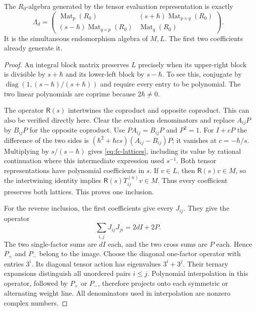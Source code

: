 \begin{theorem}\label{thm:fc-image}
The \(R_0\)-algebra generated by the tensor evaluation representation is
exactly
\begin{equation}\label{eq:fc-global-order}
 \Lambda_d=
 \begin{pmatrix}
  \operatorname{Mat}_p(R_0)&(s+\hbar)\operatorname{Mat}_{p\times q}(R_0)\\
  (s-\hbar)\operatorname{Mat}_{q\times p}(R_0)&\operatorname{Mat}_q(R_0)
 \end{pmatrix}.
\end{equation}
It is the simultaneous endomorphism algebra of \(M,L\).
The first two coefficients already generate it.
\end{theorem}
\begin{proof}
An integral block matrix preserves \(L\) precisely when its upper-right
block is divisible by \(s+\hbar\) and its lower-left block by
\(s-\hbar\). To see this, conjugate by
\(\operatorname{diag}(1,(s-\hbar)/(s+\hbar))\) and require every entry
to be polynomial. The two linear polynomials are coprime because
\(2\hbar\ne0\).

The operator \(\mathsf R(s)\) intertwines the coproduct and opposite
coproduct. This can also be verified directly here. Clear the evaluation
denominators and replace \(A_{ij}P\) by \(B_{ij}P\) for the opposite
coproduct. Use \(PA_{ij}=B_{ij}P\) and \(P^2=1\). For \(I+cP\)
the difference of the two sides is
\((\hbar^2+\hbar cs)(A_{ij}-B_{ij})P\); it vanishes at
\(c=-\hbar/s\). Multiplying by \(s/(s-\hbar)\) gives
\eqref{eq:fc-lattices}, including its value by rational continuation
where this intermediate expression used \(s^{-1}\). Both tensor
representations have polynomial coefficients in \(s\). If \(v\in L\),
then \(\mathsf R(s)v\in M\), so the intertwining identity implies
\(\mathsf R(s)T_{ij}^{(n)}v\in M\). Thus every coefficient preserves
both lattices. This proves one inclusion.

For the reverse inclusion, the first coefficients give every \(J_{ij}\).
They give the operator
\[
 \sum_{i,j}J_{ij}J_{ji}=2dI+2P.
\]
The two single-factor sums are \(dI\) each, and the two cross sums are
\(P\) each. Hence \(P_+\) and \(P_-\) belong to the image.
Choose the diagonal one-factor operator with entries \(3^i\).
Its diagonal tensor action has eigenvalues \(3^i+3^j\).
Their ternary expansions distinguish all unordered pairs \(i\leq j\).
Polynomial interpolation in this operator, followed by \(P_+\) or
\(P_-\), therefore projects onto each symmetric or alternating weight
line. All denominators used in interpolation are nonzero complex numbers.


\end{proof}
